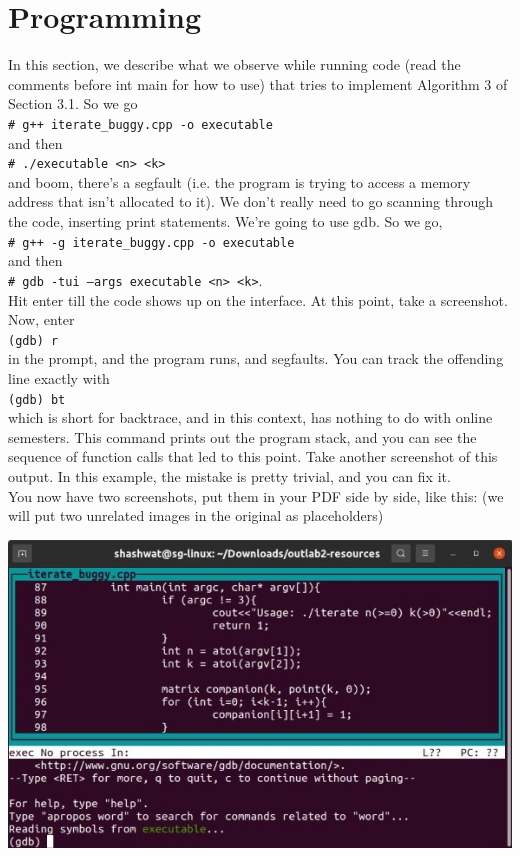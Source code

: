 \documentclass[a4paper,12pt]{article}
\numberwithin{definition}{section}
\numberwithin{mytheorem}{subsection}
\begin{document}
\section{Programming}
In this section, we describe what we observe while running code (read the comments before
int main for how to use) that tries to implement Algorithm 3 of Section 3.1. So we go\\
\texttt{\# g++ iterate\_buggy.cpp -o executable}\\
and then\\
\texttt{\# ./executable <n> <k>}\\
and boom, there’s a segfault (i.e. the program is trying to access a memory address that isn’t
allocated to it). We don’t really need to go scanning through the code, inserting print statements.
We’re going to use gdb. So we go,\\
\texttt{\# g++ -g iterate\_buggy.cpp -o executable}\\
and then\\
\texttt{\# gdb -tui --args executable <n> <k>}.\\
Hit enter till the code shows up on the interface. At this point, take a screenshot.\\
Now, enter\\
\texttt{(gdb) r}\\
in the prompt, and the program runs, and segfaults. You can track the offending line exactly with\\
\texttt{(gdb) bt}\\
which is short for backtrace, and in this context, has nothing to do with online semesters. This
command prints out the program stack, and you can see the sequence of function calls that led to
this point. Take another screenshot of this output. In this example, the mistake is pretty trivial,
and you can fix it.\\
You now have two screenshots, put them in your PDF side by side, like this: (we will put two
unrelated images in the original as placeholders)\\
\begin{minipage}{0.3\textwidth}
      \includegraphics[width=1.5\linewidth, keepaspectratio]{First Screenshot.jpeg}
    \end{minipage}
\end{document}
